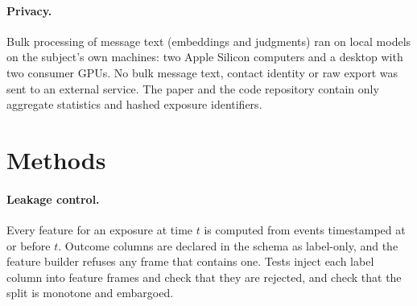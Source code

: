 \documentclass[11pt]{article}
\begin{document}
\begin{table}[t]
\centering
\small

\caption{Weak-tie exposures with complete 365-day outcomes, per split and pool. Train and validation were used for development; test was opened once after pre-registration (see the disclosure in Section~\ref{sec:methods}).}
\label{tab:pools}
\end{table}

\paragraph{Privacy.} Bulk processing of message text (embeddings and judgments) ran on local models on the subject's own machines: two Apple Silicon computers and a desktop with two consumer GPUs. No bulk message text, contact identity or raw export was sent to an external service. The paper and the code repository contain only aggregate statistics and hashed exposure identifiers.

\section{Methods}
\label{sec:methods}

\paragraph{Leakage control.} Every feature for an exposure at time $t$ is computed from events timestamped at or before $t$. Outcome columns are declared in the schema as label-only, and the feature builder refuses any frame that contains one. Tests inject each label column into feature frames and check that they are rejected, and check that the split is monotone and embargoed.
\end{document}
